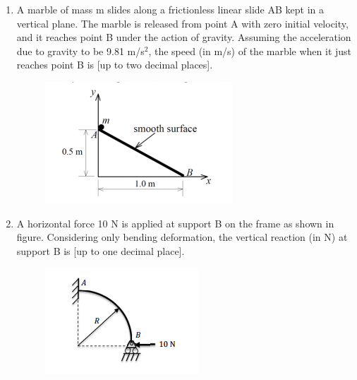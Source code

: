 \documentclass[a4paper,10pt]{article}
\begin{document}
\begin{enumerate}
    \item A marble of mass m slides along a frictionless linear slide AB kept in a vertical plane. The marble is released from point A with zero initial velocity, and it reaches point B under the action of gravity. Assuming the acceleration due to gravity to be 9.81 m/s$^2$, the speed (in m/s) of the marble when it just reaches point B is \underline{\hspace{2cm}} [up to two decimal places].
    \begin{figure}[H] \centering \includegraphics[width=0.4\columnwidth]{q21_solid.png} \caption*{} \label{fig:q21_solid} \end{figure}
    \hfill{}

    \item A horizontal force 10 N is applied at support B on the frame as shown in figure. Considering only bending deformation, the vertical reaction (in N) at support B is \underline{\hspace{2cm}} [up to one decimal place].
    \begin{figure}[H] \centering \includegraphics[width=0.3\columnwidth]{q22_solid.png} \caption*{} \label{fig:q22_solid} \end{figure}
    \hfill{}
\end{enumerate}
\clearpage
\end{document}
